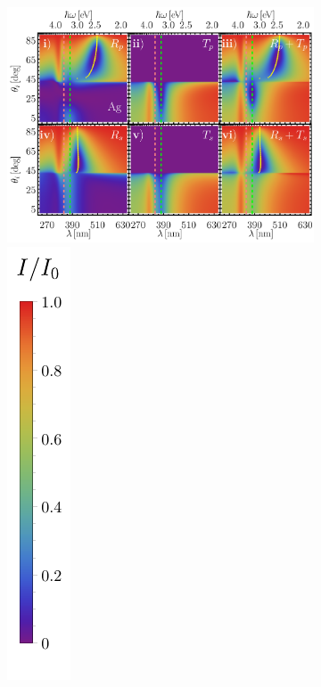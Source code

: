 \begin{figure}[h!]
\begin{subfigure}{.7\linewidth}
	\end{subfigure}\\
	\begin{subfigure}{.01\linewidth}\caption{}\label{sfig:RT-10}\vspace{6.5cm}\end{subfigure}\hspace*{-1em}
	\begin{subfigure}{.7\linewidth}\centering
	\includegraphics[scale=.58 ]{2-Resultados/figs/10-RT-AuAg/0-2D_Grid_2.png}%
		\includegraphics[scale=.89, trim={00 -5 00 00}, clip]{2-Resultados/figs/0-IBar_v}

\end{subfigure}
\end{figure}
